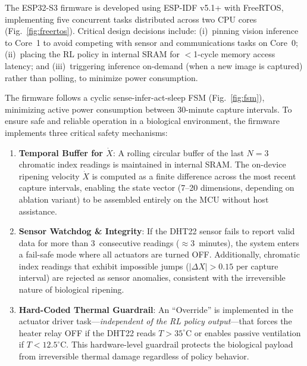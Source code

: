 \documentclass[conference]{IEEEtran}
\begin{document}
    The ESP32-S3 firmware is developed using ESP-IDF v5.1+ with FreeRTOS, implementing five concurrent tasks distributed across two CPU cores (Fig.~\ref{fig:freertos}). Critical design decisions include: (i)~pinning vision inference to Core~1 to avoid competing with sensor and communications tasks on Core~0; (ii)~placing the RL policy in internal SRAM for $<$1-cycle memory access latency; and (iii)~triggering inference on-demand (when a new image is captured) rather than polling, to minimize power consumption.

    The firmware follows a cyclic sense-infer-act-sleep FSM (Fig.~\ref{fig:fsm}), minimizing active power consumption between 30-minute capture intervals. To ensure safe and reliable operation in a biological environment, the firmware implements three critical safety mechanisms:
    \begin{enumerate}
        \item \textbf{Temporal Buffer for $\dot{X}$}: A rolling circular buffer of the last $N=3$ chromatic index readings is maintained in internal SRAM.  The on-device ripening velocity $\dot{X}$ is computed as a finite difference across the most recent capture intervals, enabling the state vector (7--20 dimensions, depending on ablation variant) to be assembled entirely on the MCU without host assistance.
        \item \textbf{Sensor Watchdog \& Integrity}: If the DHT22 sensor fails to report valid data for more than 3~consecutive readings ($\approx$3~minutes), the system enters a fail-safe mode where all actuators are turned OFF.  Additionally, chromatic index readings that exhibit impossible jumps ($|\Delta X| > 0.15$ per capture interval) are rejected as sensor anomalies, consistent with the irreversible nature of biological ripening.
        \item \textbf{Hard-Coded Thermal Guardrail}: An ``Override'' is implemented in the actuator driver task---\textit{independent of the RL policy output}---that forces the heater relay OFF if the DHT22 reads $T > 35^{\circ}$C or enables passive ventilation if $T < 12.5^{\circ}$C.  This hardware-level guardrail protects the biological payload from irreversible thermal damage regardless of policy behavior.
    \end{enumerate}
\end{document}
